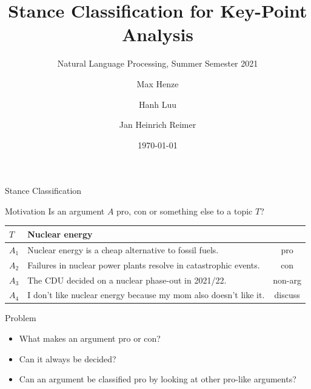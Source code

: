 \documentclass[english,handout]{mlutalk}
\title{Stance Classification for Key-Point Analysis}
\subtitle{Natural Language Processing, Summer Semester 2021}
\author{Max Henze \and Hanh Luu \and Jan Heinrich Reimer}
\institute{Martin Luther University Halle-Wittenberg}
\date{\today}
\begin{document}
\titleframe

\begin{frame}{Stance Classification}

  \begin{block}{Motivation}
    Is an argument \(A\) pro, con or something else to a topic \(T\)?
  \end{block}

  \begin{example}
    \footnotesize\centering\vspace*{1ex}
    \begin{tabular}{llc}
      \toprule
      \(T\) & Nuclear energy & \\
      \midrule
      \(A_1\) & Nuclear energy is a cheap alternative to fossil fuels. & pro \\
      \(A_2\) & Failures in nuclear power plants resolve in catastrophic events. & con \\
      \(A_3\) & The CDU decided on a nuclear phase-out in 2021/22. & non-arg \\
      \(A_4\) & I don't like nuclear energy because my mom also doesn't like it. & discuss \\
      \bottomrule
    \end{tabular}
  \end{example}

  \begin{block}{Problem}
    \begin{itemize}
      \item What makes an argument pro or con?
      \item Can it always be decided?
      \item Can an argument be classified pro by looking at other pro-like arguments?
    \end{itemize}
  \end{block}

\end{frame}
\end{document}
